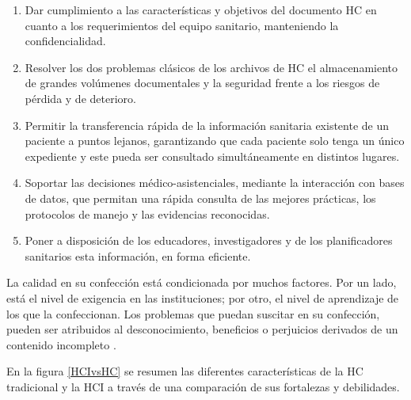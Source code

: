 \begin{enumerate}
	\item Dar cumplimiento a las características y objetivos del documento HC en cuanto a los requerimientos del equipo sanitario, manteniendo la confidencialidad.  
	
	\item Resolver los dos problemas clásicos de los archivos de HC el almacenamiento de grandes volúmenes documentales y la seguridad frente a los riesgos de pérdida y de deterioro.  
	
	\item Permitir la transferencia rápida de la información sanitaria existente de un paciente a puntos lejanos, garantizando que cada paciente solo tenga un único expediente y este pueda ser consultado simultáneamente en distintos lugares.  
	
	\item Soportar las decisiones médico-asistenciales, mediante la interacción con bases de datos, que permitan una rápida consulta de las mejores prácticas, los protocolos de manejo y las evidencias reconocidas.  
	
	\item Poner a disposición de los educadores, investigadores y de los planificadores sanitarios esta información, en forma eficiente. 
\end{enumerate}

La calidad en su confección está condicionada por muchos factores. Por un lado, está el nivel de exigencia en las instituciones; por otro, el nivel de aprendizaje de los que la confeccionan. Los problemas que puedan suscitar en su confección, pueden ser atribuidos al desconocimiento, beneficios o perjuicios derivados de un contenido incompleto  .

En la figura \ref{HCIvsHC} se resumen las diferentes características de la HC tradicional y la HCI a través de una comparación de sus fortalezas y debilidades.



